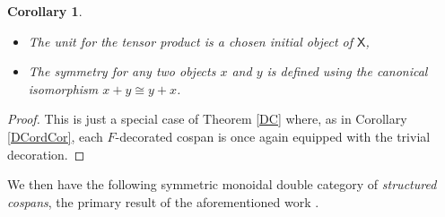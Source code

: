\documentclass[oneside,final]{ucr}
\newtheorem{corollary}[theorem]{Corollary}
\theoremstyle{definition}
\newcommand{\X}{\mathsf{X}}
\begin{document}
{\begin{corollary}
\begin{itemize}
\[\begin{tikzpicture}[scale=1.5]
\node (G''''') at (5.75,-3) {$y_2 + y_2'$};
\node (Y) at (3,-2.5) {$=$};
\path[->,font=\scriptsize,>=angle 90]
(F) edge node[above]{$o_1$} (G)
(E) edge node[left]{$f$} (E')
(F) edge node[right]{$h$} (F')
(G) edge node[left]{$g$} (G')
(E) edge node[above]{$i_1$} (G)
(E') edge node[below]{$i_2$} (G')
(F') edge node[below]{$o_2$} (G')
(F'') edge node[above]{$o_1'$} (G'')
(E'') edge node[left]{$f'$} (E''')
(F'') edge node[right]{$h'$} (F''')
(G'') edge node[left]{$g'$} (G''')
(E'') edge node[above]{$i_1'$} (G'')
(E''') edge node[below]{$i_2'$} (G''')
(F''') edge node[below]{$o_2'$} (G''')
(F'''') edge node[above]{$o_1 + o_1'$} (G'''')
(E'''') edge node[left]{$f + f'$} (E''''')
(F'''') edge node[right]{$h + h'$} (F''''')
(G'''') edge node[left]{$g + g'$} (G''''')
(E'''') edge node[above]{$i_1 + i_1'$} (G'''')
(E''''') edge node[below]{$i_2 + i_2'$} (G''''')
(F''''') edge node[below]{$o_2 + o_2'$} (G''''');
\end{tikzpicture}
\]
\item The unit for the tensor product is a chosen initial object of $\X$,
\item The symmetry for any two objects $x$ and $y$ is defined using the canonical isomorphism $x + y \cong y + x$.
\end{itemize}
\end{corollary}

\begin{proof}
This is just a special case of Theorem \ref{DC} where, as in Corollary \ref{DCordCor}, each $F$-decorated cospan is once again equipped with the trivial decoration.
\end{proof}


We then have the following symmetric monoidal double category of \emph{structured cospans}, the primary result of the aforementioned work \cite{BC2}.

}
\end{document}

